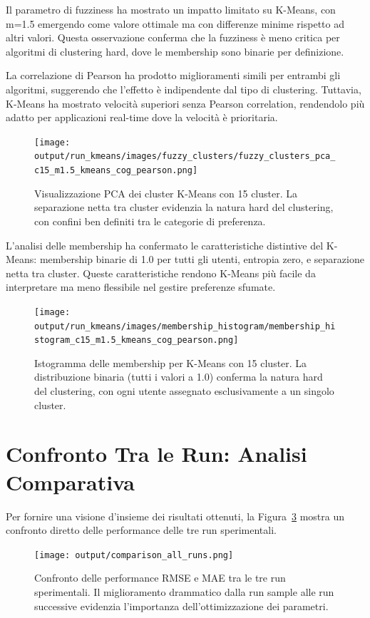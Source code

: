 Il parametro di fuzziness ha mostrato un impatto limitato su K-Means, con m=1.5 emergendo come valore ottimale ma con differenze minime rispetto ad altri valori. Questa osservazione conferma che la fuzziness è meno critica per algoritmi di clustering hard, dove le membership sono binarie per definizione.

La correlazione di Pearson ha prodotto miglioramenti simili per entrambi gli algoritmi, suggerendo che l'effetto è indipendente dal tipo di clustering. Tuttavia, K-Means ha mostrato velocità superiori senza Pearson correlation, rendendolo più adatto per applicazioni real-time dove la velocità è prioritaria.

\begin{figure}[h]
\centering
\texttt{[image: output/run\_kmeans/images/fuzzy\_clusters/fuzzy\_clusters\_pca\_c15\_m1.5\_kmeans\_cog\_pearson.png]}
\caption{Visualizzazione PCA dei cluster K-Means con 15 cluster. La separazione netta tra cluster evidenzia la natura hard del clustering, con confini ben definiti tra le categorie di preferenza.}
\label{fig:kmeans_clusters_pca}
\end{figure}

L'analisi delle membership ha confermato le caratteristiche distintive del K-Means: membership binarie di 1.0 per tutti gli utenti, entropia zero, e separazione netta tra cluster. Queste caratteristiche rendono K-Means più facile da interpretare ma meno flessibile nel gestire preferenze sfumate.

\begin{figure}[h]
\centering
\texttt{[image: output/run\_kmeans/images/membership\_histogram/membership\_histogram\_c15\_m1.5\_kmeans\_cog\_pearson.png]}
\caption{Istogramma delle membership per K-Means con 15 cluster. La distribuzione binaria (tutti i valori a 1.0) conferma la natura hard del clustering, con ogni utente assegnato esclusivamente a un singolo cluster.}
\label{fig:kmeans_membership_hist}
\end{figure}

\section{Confronto Tra le Run: Analisi Comparativa}

Per fornire una visione d'insieme dei risultati ottenuti, la Figura~\ref{fig:comparison_all_runs} mostra un confronto diretto delle performance delle tre run sperimentali.

\begin{figure}[h]
\centering
\texttt{[image: output/comparison\_all\_runs.png]}
\caption{Confronto delle performance RMSE e MAE tra le tre run sperimentali. Il miglioramento drammatico dalla run sample alle run successive evidenzia l'importanza dell'ottimizzazione dei parametri.}
\label{fig:comparison_all_runs}
\end{figure}

